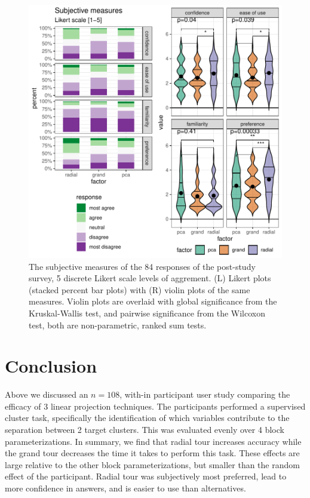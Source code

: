 \documentclass{template/monashthesis}
\begin{document}
\begin{figure}

{\centering \includegraphics[width=1\linewidth,]{./figures_from_script/ch4_fig6_subjective_measures} 

}

\caption{The subjective measures of the 84 responses of the post-study survey, 5 discrete Likert scale levels of aggrement. (L) Likert plots (stacked percent bar plots) with (R) violin plots of the same measures. Violin plots are overlaid with global significance from the Kruskal-Wallis test, and pairwise significance from the Wilcoxon test, both are non-parametric, ranked sum tests.}\label{fig:ch4fig6}
\end{figure}

\hypertarget{sec:conclusion}{%
\section{Conclusion}\label{sec:conclusion}}

Above we discussed an \(n=108\), with-in participant user study comparing the efficacy of 3 linear projection techniques. The participants performed a supervised cluster task, specifically the identification of which variables contribute to the separation between 2 target clusters. This was evaluated evenly over 4 block parameterizations. In summary, we find that radial tour increases accuracy while the grand tour decreases the time it takes to perform this task. These effects are large relative to the other block parameterizations, but smaller than the random effect of the participant. Radial tour was subjectively most preferred, lead to more confidence in answers, and is easier to use than alternatives.
\end{document}
